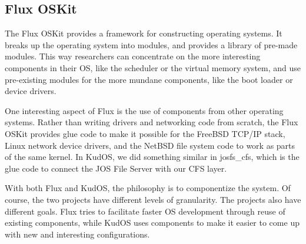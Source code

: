 \subsection{Flux OSKit}

The Flux OSKit \cite{ford97oskit} provides a framework for constructing
operating systems. It breaks up the operating system into modules, and provides
a library of pre-made modules. This way researchers can concentrate on the more
interesting components in their OS, like the scheduler or the virtual memory
system, and use pre-existing modules for the more mundane components, like the
boot loader or device drivers.

One interesting aspect of Flux is the use of components from other operating
systems. Rather than writing drivers and networking code from scratch, the Flux
OSKit provides glue code to make it possible for the FreeBSD TCP/IP stack, Linux
network device drivers, and the NetBSD file system code to work as parts of the
same kernel. In KudOS, we did something similar in josfs\_cfs, which is the glue
code to connect the JOS File Server with our CFS layer.

With both Flux and KudOS, the philosophy is to componentize the system. Of
course, the two projects have different levels of granularity. The projects also
have different goals. Flux tries to facilitate faster OS development through
reuse of existing components, while KudOS uses components to make it easier to
come up with new and interesting configurations.
